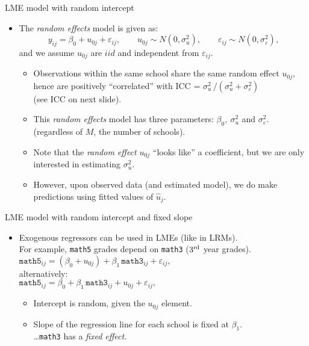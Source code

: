 \documentclass{beamer}
\begin{document}
\begin{frame}{LME model with random intercept}
\begin{itemize}
\item The \textit{random effects} model is given as:
$$ y_{ij} = \beta_{0} + u_{0j} + \varepsilon_{ij}, \qquad u_{0j} \sim N(0,\sigma^2_u), \qquad \varepsilon_{ij} \sim N(0,\sigma^2_{\varepsilon}), $$
and we assume $u_{0j}$ are $iid$ and independent from $\varepsilon_{ij}$.\\
\smallskip
\begin{itemize}
\item Observations within the same school share the same random effect $u_{0j}$, hence are positively ``correlated'' with \textnormal{ICC} = $\sigma^2_u \, / (\sigma^2_u + \sigma^2_{\varepsilon})$ \\ (see ICC on next slide).
\medskip
\item This \textit{random effects} model has three parameters: $\beta_{0},~ \sigma^2_u$ and $\sigma^2_{\varepsilon}$. (regardless of $M$, the number of schools).
\medskip
\item Note that the \textit{random effect} $u_{0j}$ ``looks like'' a coefficient, but we are only interested in estimating $\sigma^2_u$.
\medskip
\item However, upon observed data (and estimated model), we do make predictions using fitted values of $\hat{u}_j$.
\end{itemize}
\end{itemize}
\end{frame}
\begin{frame}{LME model with random intercept and fixed slope}
\begin{itemize}
\item Exogenous regressors can be used in LMEs (like in LRMs).\\
\smallskip
For example, \texttt{math5} grades depend on \texttt{math3} ($3{^{\textnormal{rd}}}$ year grades).\\
\bigskip
$ \texttt{math5}_{ij} = \left( \beta_{0} + u_{0j} \right) + \beta_1 \, \texttt{math3}_{ij} + \varepsilon_{ij}, $\\
\medskip
alternatively: \\ \medskip
$ \texttt{math5}_{ij} = \beta_{0} + \beta_1 \, \texttt{math3}_{ij} + u_{0j} + \varepsilon_{ij}, $\\
\bigskip
\begin{itemize}
\item Intercept is random, given the $u_{0j}$ element.
\smallskip
\item Slope of the regression line for each school is fixed at $\beta_1$.\\
\dots \texttt{math3} has a \textit{fixed effect}.
\end{itemize}
\end{itemize}
\end{frame}
\end{document}
